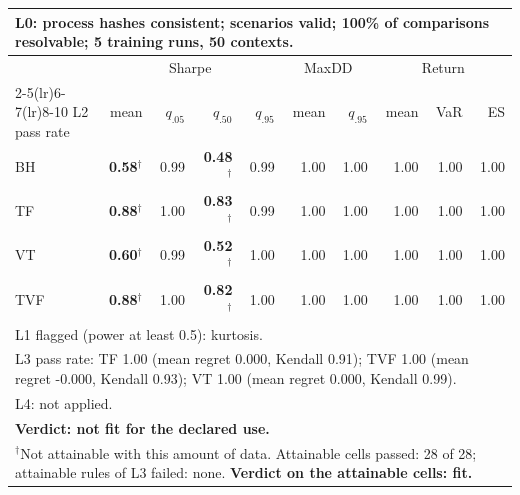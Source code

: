 \begin{tabular}{lrrrrrrrrr}
\toprule
\multicolumn{10}{p{13.5cm}}{L0: process hashes consistent; scenarios valid; 100\% of comparisons resolvable; 5 training runs, 50 contexts.} \\
\midrule
 & \multicolumn{4}{c}{Sharpe} & \multicolumn{2}{c}{MaxDD} & \multicolumn{3}{c}{Return} \\
\cmidrule(lr){2-5}\cmidrule(lr){6-7}\cmidrule(lr){8-10}
L2 pass rate & mean & $q_{.05}$ & $q_{.50}$ & $q_{.95}$ & mean & $q_{.95}$ & mean & VaR & ES \\
\midrule
BH & \textbf{0.58}$^{\dagger}$ & 0.99 & \textbf{0.48}$^{\dagger}$ & 0.99 & 1.00 & 1.00 & 1.00 & 1.00 & 1.00 \\
TF & \textbf{0.88}$^{\dagger}$ & 1.00 & \textbf{0.83}$^{\dagger}$ & 0.99 & 1.00 & 1.00 & 1.00 & 1.00 & 1.00 \\
VT & \textbf{0.60}$^{\dagger}$ & 0.99 & \textbf{0.52}$^{\dagger}$ & 1.00 & 1.00 & 1.00 & 1.00 & 1.00 & 1.00 \\
TVF & \textbf{0.88}$^{\dagger}$ & 1.00 & \textbf{0.82}$^{\dagger}$ & 1.00 & 1.00 & 1.00 & 1.00 & 1.00 & 1.00 \\
\midrule
\multicolumn{10}{p{13.5cm}}{L1 flagged (power at least 0.5): kurtosis.} \\
\multicolumn{10}{p{13.5cm}}{L3 pass rate: TF 1.00 (mean regret 0.000, Kendall 0.91); TVF 1.00 (mean regret -0.000, Kendall 0.93); VT 1.00 (mean regret 0.000, Kendall 0.99).} \\
\multicolumn{10}{p{13.5cm}}{L4: not applied.} \\
\multicolumn{10}{p{13.5cm}}{\textbf{Verdict: not fit for the declared use.}} \\
\multicolumn{10}{p{13.5cm}}{$^{\dagger}$Not attainable with this amount of data. Attainable cells passed: 28 of 28; attainable rules of L3 failed: none. \textbf{Verdict on the attainable cells: fit.}} \\
\bottomrule
\end{tabular}
